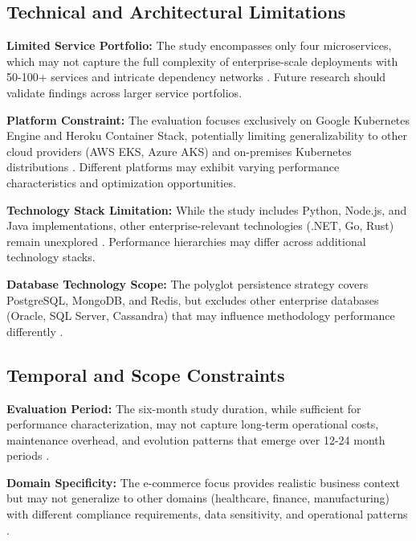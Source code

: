 \subsection{Technical and Architectural Limitations}
\label{subsec:technical_limitations}

\textbf{Limited Service Portfolio:} The study encompasses only four microservices, which may not capture the full complexity of enterprise-scale deployments with 50-100+ services and intricate dependency networks \cite{enterprise_scale_challenges,large_system_complexity}. Future research should validate findings across larger service portfolios.

\textbf{Platform Constraint:} The evaluation focuses exclusively on Google Kubernetes Engine and Heroku Container Stack, potentially limiting generalizability to other cloud providers (AWS EKS, Azure AKS) and on-premises Kubernetes distributions \cite{multi_cloud_evaluation,platform_specific_optimizations}. Different platforms may exhibit varying performance characteristics and optimization opportunities.

\textbf{Technology Stack Limitation:} While the study includes Python, Node.js, and Java implementations, other enterprise-relevant technologies (.NET, Go, Rust) remain unexplored \cite{technology_diversity,programming_language_performance}. Performance hierarchies may differ across additional technology stacks.

\textbf{Database Technology Scope:} The polyglot persistence strategy covers PostgreSQL, MongoDB, and Redis, but excludes other enterprise databases (Oracle, SQL Server, Cassandra) that may influence methodology performance differently \cite{database_performance_impact,polyglot_persistence_challenges}.

\subsection{Temporal and Scope Constraints}
\label{subsec:temporal_constraints}

\textbf{Evaluation Period:} The six-month study duration, while sufficient for performance characterization, may not capture long-term operational costs, maintenance overhead, and evolution patterns that emerge over 12-24 month periods \cite{longitudinal_studies,long_term_operational_costs}.

\textbf{Domain Specificity:} The e-commerce focus provides realistic business context but may not generalize to other domains (healthcare, finance, manufacturing) with different compliance requirements, data sensitivity, and operational patterns \cite{domain_specific_requirements,industry_variations}.


